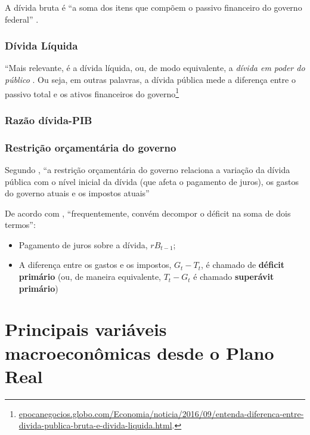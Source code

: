 \documentclass[
	10pt,				%
	openright,			%
	twoside,			%
	a5paper,			%
	english,			%
	french,				%
	spanish,			%
	brazil				%
	]{abntex2}
\begin{document}
A dívida bruta é ``a soma dos itens que compõem o passivo financeiro do
governo federal'' \cite[p.~537]{blanchard}.

\subsubsection{Dívida Líquida}\label{duxedvida-luxedquida}

``Mais relevante, é a dívida líquida, ou, de modo equivalente, a
\emph{dívida em poder do público} \cite[p.~537]{blanchard}. Ou seja, em
outras palavras, a dívida pública mede a diferença entre o passivo total
e os ativos financeiros do governo\footnote{\href{http://epocanegocios.globo.com/Economia/noticia/2016/09/entenda-diferenca-entre-divida-publica-bruta-e-divida-liquida.html}{epocanegocios.globo.com/Economia/noticia/2016/09/entenda-diferenca-entre-divida-publica-bruta-e-divida-liquida.html}.}

\subsubsection{Razão dívida-PIB}\label{razuxe3o-duxedvida-pib}

\subsubsection{Restrição orçamentária do
governo}\label{restriuxe7uxe3o-oruxe7amentuxe1ria-do-governo}

Segundo , ``a restrição orçamentária do
governo relaciona a variação da dívida pública com o nível inicial da
dívida (que afeta o pagamento de juros), os gastos do governo atuais e
os impostos atuais'' \cite[p.525]{blanchard}

De acordo com , ``frequentemente, convém
decompor o déficit na soma de dois termos'':

\begin{itemize}
\tightlist
\item
  Pagamento de juros sobre a dívida, \(rB_{t-1}\);
\item
  A diferença entre os gastos e os impostos, \(G_t - T_t\), é chamado de
  \textbf{déficit primário} (ou, de maneira equivalente, \(T_t - G_t\) é
  chamado \textbf{superávit primário})
\end{itemize}

\section{Principais variáveis macroeconômicas desde o Plano
Real}\label{sec:evolucao}
\end{document}
